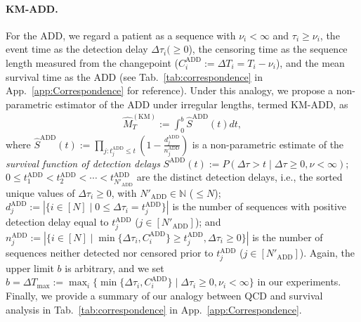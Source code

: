 \documentclass{article}
\theoremstyle{plain}
\theoremstyle{definition}
\theoremstyle{remark}
\def\mbn{\mathbb{N}}
\begin{document}

\paragraph{KM-ADD.}
For the ADD, we regard a patient as a sequence with $\nu_i < \infty$ and $\tau_i \geq \nu_i$, the event time as the detection delay $\Delta \tau_i (\geq 0$), the censoring time as the sequence length measured from the changepoint ($C_i^\mathrm{ADD} := \Delta T_i = T_i - \nu_i$), and the mean survival time as the ADD (see Tab.~\ref{tab:correspondence} in App.~\ref{app:Correspondence} for reference).
Under this analogy, we propose a non-parametric estimator of the ADD under irregular lengths, termed KM-ADD, as 
\begin{align}
    \hat{M}_T^\mathrm{(KM)} := \int_0^{b} \hat{S}^\mathrm{ADD}(t) dt, 
\end{align}
where 
$\hat{S}^\mathrm{ADD}(t) := \prod_{j: t_j^\mathrm{ADD} \leq t} (1 - \frac{d_j^\mathrm{ADD}}{n_j^\mathrm{ADD}})$ is a non-parametric estimate of the \textit{survival function of detection delays} $S^\mathrm{ADD}(t) := P(\Delta \tau > t \mid \Delta \tau \geq 0, \nu < \infty)$;
$0 \leq t_1^\mathrm{ADD} < t_2^\mathrm{ADD} < \cdots < t_{N'_\mathrm{ADD}}^\mathrm{ADD}$ are the distinct detection delays, i.e., the sorted unique values of $\Delta \tau_i \geq 0$, with $N'_\mathrm{ADD} \in \mbn$ ($\leq N$);
$d_j^\mathrm{ADD} := | \{ i \in [N] \mid 0 \leq \Delta \tau_i = t_j^\mathrm{ADD} \} |$ is the number of sequences with positive detection delay equal to $t_j^\mathrm{ADD}$ ($j \in [N'_\mathrm{ADD}]$);
and $n_j^\mathrm{ADD} := |\{i \in [N] \mid \min \{ \Delta \tau_i,  C_i^\mathrm{ADD} \} \geq t_j^\mathrm{ADD}, \Delta \tau_i \geq 0 \}|$ is the number of sequences neither detected nor censored prior to $t_j^\mathrm{ADD}$ ($j \in [N'_\mathrm{ADD}]$).
Again, the upper limit $b$ is arbitrary, and we set $b = \Delta T_\mathrm{max} := \max_i \{ \min \{ \Delta \tau_i, C_i^\mathrm{ADD} \} \mid \Delta \tau_i \geq 0, \nu_i < \infty \}$ in our experiments.
Finally, we provide a summary of our analogy between QCD and survival analysis in Tab.~\ref{tab:correspondence} in App.~\ref{app:Correspondence}.
\end{document}
